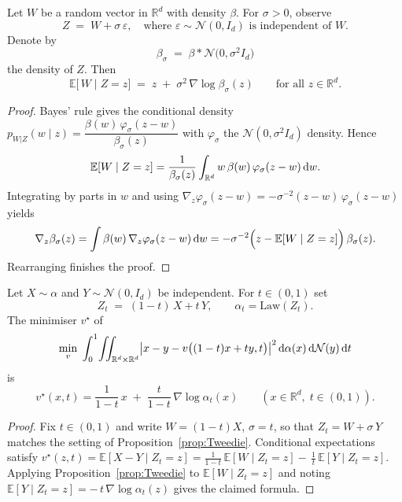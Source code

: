 \begin{proposition}\label{prop:Tweedie}
Let $W$ be a random vector in $\mathbb R^{d}$ with density $\beta$.  
For $\sigma>0$, observe
\[
Z \;=\; W + \sigma\,\varepsilon, 
\quad\text{where } \varepsilon \sim \mathcal N(0,I_{d}) 
\text{ is independent of } W .
\]
Denote by 
\[
	\beta_\sigma \;=\; \beta * \mathcal N\bigl(0,\sigma^{2}I_{d}\bigr)
\]
the density of $Z$.  
Then
\[
\mathbb E\bigl[\,W \mid Z=z\bigr] 
      \;=\; z \;+\;\sigma^{2}\,\nabla \log \beta_\sigma(z)
\qquad\text{for all } z \in \mathbb R^{d}.
\]
\end{proposition}

\begin{proof}
Bayes' rule gives the conditional density
$
p_{W|Z}(w\mid z) 
= \dfrac{\beta(w)\,\varphi_\sigma(z-w)}{\beta_\sigma(z)}
$
with $\varphi_\sigma$ the $\mathcal N(0,\sigma^{2}I_{d})$ density.  
Hence
\[
\mathbb E[W\mid Z=z]
= \frac{1}{\beta_\sigma(z)}
      \int_{\mathbb R^{d}} w\,
             \beta(w)\,\varphi_\sigma(z-w)\,\mathrm{d} w .
\]
Integrating by parts in $w$ and using
$
\nabla_z\varphi_\sigma(z-w)
     = -\sigma^{-2}(z-w)\,\varphi_\sigma(z-w)
$
yields
\[
\nabla_z\beta_\sigma(z)
= \int \beta(w)\,\nabla_z\varphi_\sigma(z-w)\,\mathrm{d} w
= -\sigma^{-2}\Bigl(z-\mathbb E[W\mid Z=z]\Bigr)\,\beta_\sigma(z).
\]
Rearranging finishes the proof.
\end{proof}



\begin{proposition}\label{prop:flow}
Let $X\sim\alpha$ and $Y\sim\mathcal N(0,I_{d})$ be independent.  
For $t\in(0,1)$ set
\[
Z_t \;=\; (1-t)\,X + t\,Y,
\qquad 
\alpha_t =\text{Law}(Z_t).
\]
The minimiser $v^\star$ of
\[
\min_{v}\;\int_{0}^{1}\!
         \iint_{\mathbb R^{d}\times\mathbb R^{d}}
              \bigl|x-y-v\bigl((1-t)x+t y,t\bigr)\bigr|^{2}\,
              \mathrm{d}\alpha(x)\,\mathrm{d}\mathcal N(y)\,\mathrm{d} t
\]
is
\[
v^\star(x,t) 
= \frac{1}{1-t}\,x \;+\; \frac{t}{1-t}\,\nabla\log\alpha_t(x)
\qquad (x\in\mathbb R^{d},\;t\in(0,1)).
\]
\end{proposition}

\begin{proof}
Fix $t\in(0,1)$ and write $W=(1-t)X$, $\sigma=t$, so that 
$Z_t = W + \sigma\,Y$ matches the setting of Proposition~\ref{prop:Tweedie}.  
Conditional expectations satisfy
$
v^\star(z,t)
= \mathbb E[X-Y\mid Z_t=z]
= \frac{1}{1-t}\,\mathbb E[W\mid Z_t=z]
  -\,\frac{1}{t}\,\mathbb E[Y\mid Z_t=z].
$
Applying Proposition~\ref{prop:Tweedie} to $\mathbb E[W\mid Z_t=z]$ and
noting $\mathbb E[Y\mid Z_t=z]
      = -\,t\,\nabla\log\alpha_t(z)$
gives the claimed formula.
\end{proof}

